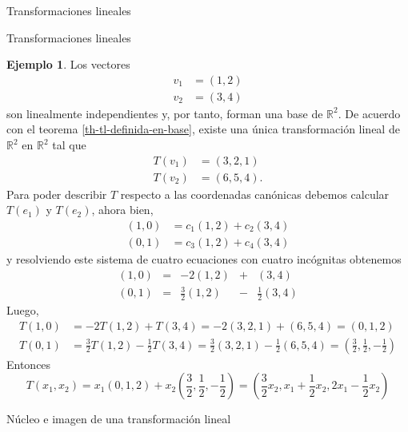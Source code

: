 \documentclass[a4paper,12pt,twoside,spanish]{amsbook}
\theoremstyle{definition}
\newtheorem{ejemplo}{Ejemplo}[section]
\theoremstyle{remark}
\newcommand{\R}{\mathbb R}
\begin{document}
\begin{chapter}{Transformaciones lineales}
\begin{section}{Transformaciones lineales}
		\begin{ejemplo}
			Los vectores
			\begin{align*}
				v_1 &= (1,2)\\
				v_2 &= (3,4)
			\end{align*}
			son linealmente independientes y, por tanto, forman una base de $\R^2$. De acuerdo con el teorema \ref{th-tl-definida-en-base}, existe una única transformación lineal de $\R^2$ en $\R^2$ tal que
			\begin{align*}
				T(v_1) &= (3,2, 1) \\
				T(v_2) &= (6, 5,4).
			\end{align*}
			Para poder describir $T$ respecto a las coordenadas canónicas debemos calcular $T(e_1)$ y $T(e_2)$,  ahora bien,
			\begin{align*}
			(1,0) &= c_{1}(1,2) + c_{2}(3,4)\\
			(0,1) &= c_{3}(1,2) + c_{4}(3,4)
			\end{align*}
			y resolviendo este sistema de cuatro ecuaciones con cuatro incógnitas obtenemos
			\begin{equation*}
			\begin{array}{rcrcr}
			(1,0) &=& -2(1,2) &+ &(3,4)\\
			(0,1) &=& \displaystyle\frac32(1,2) &- &\displaystyle\frac12(3,4)
			\end{array}
			\end{equation*}
			Luego, 
				\begin{align*}
			T(1,0) &= -2T(1,2)+ T(3,4) = -2(3,2, 1)+(6, 5,4) = (0,1,2)\\
			T(0,1) &= \displaystyle\frac32T(1,2) - \displaystyle\frac12T(3,4) = \displaystyle\frac32(3,2,1) - \displaystyle\frac12(6, 5,4)= (\displaystyle\frac32,\displaystyle\frac12,-\displaystyle\frac12)
			\end{align*}
			Entonces
				\begin{equation*}
			T(x_1,x_2) = x_1(0,1,2) + x_2		 (\displaystyle\frac32,\displaystyle\frac12,-\displaystyle\frac12)
			= (\displaystyle\frac32x_2,x_1+\displaystyle\frac12x_2,2x_1-\displaystyle\frac12x_2)
			\end{equation*}
		\end{ejemplo}
		
		\end{section}
	
	
		\begin{section}{Núcleo e imagen de una transformación lineal}
		

\end{section}
\end{chapter}
\end{document}
